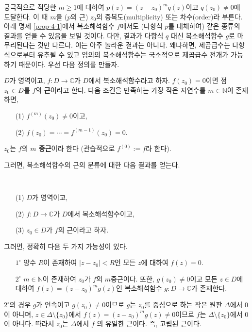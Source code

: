궁극적으로 적당한 $m\ge1$에 대하여 $p(z) = (z-z_0)^mq(z)$이고  $q(z_0)\ne0$에 도달한다.
이 때 $m$을 ($p$의 근) $z_0$의 중복도(multiplicity) 또는 차수(order)라 부른다.
아래 명제 \ref{prop-4-1}에서 복소해석함수 $f$에서도 (다항식 $p$를 대체하여)
같은 종류의 결과를 얻을 수 있음을 보일 것이다.
다만, 결과가 다항식 $q$ 대신 복소해석함수 $g$로 마무리된다는 것만 다르다.
이는 아주 놀라운 결과는 아니다. 왜냐하면, 제곱급수는 다항식으로부터 유추될 수 있고
임의의 복소해석함수는 국소적으로 제곱급수 전개가 가능하기 때문이다.
우선 다음 정의를 만들자.

\begin{salt_definition} \label{def-4-2}
$D$가 영역이고, $f:D\to\mathbb C$가 $D$에서 복소해석함수라고 하자.
$f(z_0)=0$이면 점 $z_0\in D$를 $f$의 {\bf 근}이라고 한다.
다음 조건을 만족하는 가장 작은 자연수를 $m\in\mathbb N$이 존재하면,
\begin{itemize}
\item[(1)] $f^{(m)}(z_0) \ne 0$이고,
\item[(2)] $f(z_0) = \cdots = f^{(m-1)}(z_0) = 0$.
\end{itemize}
$z_0$는 $f$의 {\bf $m$ 중근}이라 한다
(관습적으로 $f^{(0)} := f$라 한다).
\end{salt_definition}

그러면, 복소해석함수의 근의 분류에 대한 다음 결과를 얻는다.

\begin{salt_prop} [근의 분류] \label{prop-4-1}
\
\begin{itemize}
\item[(1)] $D$가 영역이고,
\item[(2)] $f:D\to\mathbb C$가 $D$에서 복소해석함수이고,
\item[(3)] $z_0 \in D$가 $f$의 근이라고 하자.
\end{itemize}
그러면, 정확히 다음 두 가지 가능성이 있다.
\begin{itemize}
\item[$1^\circ$] 양수 $R$이 존재하여 $|z-z_0|<R$인 모든 $z$에 대하여
$f(z)=0$.
\item[$2^\circ$] $m\in\mathbb N$이 존재하여
 $z_0$가 $f$의 $m$중근이다. 또한, 
 $g(z_0)\ne0$이고 모든 $z\in D$에 대하여 $f(z) = (z-z_0)^mg(z)$인
 복소해석함수 $g:D\to\mathbb C$가 존재한다.
\end{itemize}
\end{salt_prop}

$2^\circ$의 경우 $g$가 연속이고 $g(z_0)\ne0$이므로
$g$는 $z_0$를 중심으로 하는 작은 원판 $\Delta$에서 $0$이 아니며,
$z\in \Delta\setminus \{z_0\}$에서 $f(z) = (z-z_0)^mg(z) \ne 0$이므로
$f$는 $\Delta\setminus \{z_0\}$에서 $0$이 아니다.
따라서 $z_0$는 $\Delta$에서 $f$ 의 유일한 근이다. 즉, 고립된 근이다.

